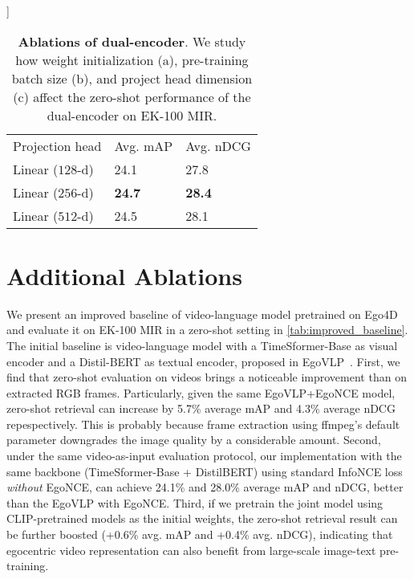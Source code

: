 \documentclass[10pt,twocolumn,letterpaper]{article}
\newcommand{\tablestyle}[2]{\setlength{\tabcolsep}{#1}\renewcommand{\arraystretch}{#2}\centering\footnotesize}
\newcommand{\thickhline}{\Xhline{3\arrayrulewidth}}
\newcommand{\myparagraph}[1]{\vspace{0pt}\noindent{\bf #1}}
\newcommand{\ekmir}{EK-100 MIR\xspace}
\begin{document}
\begin{table*}[t]
	\label{tab:projection_head}
	]{
		\begin{minipage}{0.25\linewidth}{\begin{center}
					\tablestyle{1pt}{1.05}
					\begin{tabular}{x{48}|x{24}x{24}}
						Projection head & Avg. mAP & Avg. nDCG  \\
						\thickhline
						Linear ($128$-d) & 24.1 & 27.8  \\
						 Linear ($256$-d) & {\bf 24.7} & {\bf 28.4} \\
						Linear ($512$-d) &  24.5 & 28.1 \\
						\hline
					\end{tabular}
		\end{center}}\end{minipage}
	}
	\caption{\textbf{Ablations of dual-encoder}. We study how weight initialization (a), pre-training batch size (b), and project head dimension (c) affect the zero-shot performance of the dual-encoder on \ekmir.}
	\label{tab:ablations_vlp}
\end{table*}


\section{Additional Ablations}\label{sec:appdx:ablations}

\myparagraph{Improved Baseline on EK-100 MIR.}
We present an improved baseline of video-language model pretrained on Ego4D and evaluate it on EK-100 MIR in a zero-shot setting in \cref{tab:improved_baseline}.
The initial baseline is video-language model with a TimeSformer-Base as visual encoder and a Distil-BERT as textual encoder, proposed in EgoVLP~\cite{lin2022egovlp}.
First, we find that zero-shot evaluation on videos brings a noticeable improvement than on extracted RGB frames.
Particularly, given the same EgoVLP+EgoNCE model, zero-shot retrieval can increase by 5.7\% average mAP and 4.3\% average nDCG repespectively.
This is probably because frame extraction using ffmpeg's default parameter downgrades the image quality by a considerable amount.
Second, under the same video-as-input evaluation protocol, our implementation with the same backbone (TimeSformer-Base + DistilBERT) using standard InfoNCE loss \emph{without} EgoNCE, can achieve 24.1\% and 28.0\% average mAP and nDCG, better than the EgoVLP with EgoNCE.
Third, if we pretrain the joint model using CLIP-pretrained models as the initial weights, the zero-shot retrieval result can be further boosted (+0.6\% avg. mAP and +0.4\% avg. nDCG), indicating that egocentric video representation can also benefit from large-scale image-text pre-training.
\end{document}

